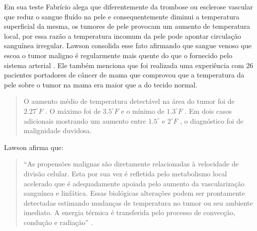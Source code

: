  Em sua teste  Fabrício \cite{Fabricio} alega que diferentemente da trombose ou esclerose vascular que reduz o sangue  fluído na pele e consequentemente diminui a temperatura superficial da mesma, os tumores de pele provocam um aumento de temperatura local, por essa razão a temperatura incomum da pele pode apontar circulação sanguínea irregular.
 Lawson\cite{Lawson} consolida esse fato afirmando que  sangue venoso que escoa o tumor maligno é regularmente mais quente  do que o fornecido pelo sistema arterial . Ele também menciona que foi realizada uma experiência com 26 pacientes portadores de câncer de mama que comprovou que a temperatura da pele sobre o tumor na mama era maior que a do tecido normal. 
    
\begin{quotation}
 O aumento médio de temperatura detectável na área do tumor foi de $ 2.27^{\circ}F$ . O máximo foi de $ 3.5^{\circ}F $ e o mínimo de $ 1.3^{\circ}F$ . Em dois casos adicionais mostrando um aumento entre $ 1.5^{\circ} $  e $ 2^{\circ}F$ , o diagnóstico foi de malignidade duvidosa\cite[p.309]{Lawson}.\end{quotation}%
 


   
   
  
   Lawson afirma que:\begin{quotation} 
  
  ``As propensões malignas são diretamente relacionadas à velocidade de divisão celular. Esta por sua vez é refletida pelo metabolismo local acelerado que é adequadamente apoiada pelo aumento da vascularização sanguínea e linfática. Essas biológicas alterações podem ser prontamente detectadas estimando mudanças de temperatura no tumor ou seu ambiente imediato. A energia térmica é transferida pelo processo de convecção, condução e radiação''\cite[p.309]{Lawson} .\end{quotation}
  

